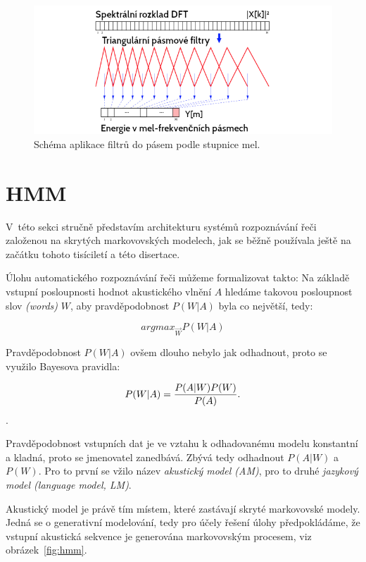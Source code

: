 \begin{figure}[htpb]
\includegraphics[scale=0.58]{rc/mfcc-mels.png}
\caption{
    Schéma aplikace filtrů do pásem podle stupnice mel.
}
\label{fig:mfcc-mels}
\end{figure}

\section{HMM}

V~této sekci stručně představím architekturu systémů rozpoznávání řeči založenou
na skrytých markovovských modelech, jak se běžně používala ještě na začátku
tohoto tisíciletí a této disertace.

Úlohu automatického rozpoznávání řeči můžeme formalizovat takto: Na základě vstupní
posloupnosti hodnot akustického vlnění $A$ hledáme takovou posloupnost slov
\textit{(words)} $W$, aby pravděpodobnost $P(W|A)$ byla co největší, tedy:

\begin{equation}
argmax_{\vec{W}} P(W|A)
\end{equation}

Pravděpodobnost $P(W|A)$ ovšem dlouho nebylo jak odhadnout, proto se využilo
Bayesova pravidla:

\begin{equation}
P(W|A) = {{P(A|W) P(W)}\over{P(A)}}.
\end{equation}.

Pravděpodobnost vstupních dat je ve vztahu k odhadovanému modelu konstantní a
kladná, proto se jmenovatel zanedbává. Zbývá tedy odhadnout $P(A|W)$ a $P(W)$.
Pro to první se vžilo název \textit{akustický model (AM)}, pro to druhé
\textit{jazykový model (language model, LM)}.

Akustický model je právě tím místem, které zastávají skryté markovovské modely.
Jedná se o generativní modelování, tedy pro účely řešení úlohy předpokládáme, že
vstupní akustická sekvence je generována markovovským procesem, viz
obrázek~\ref{fig:hmm}.


